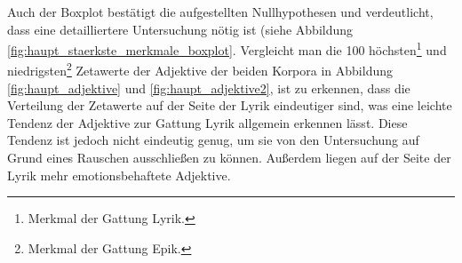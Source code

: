 \documentclass[a4paper,10p]{article}
\begin{document}
Auch der Boxplot bestätigt die aufgestellten Nullhypothesen und verdeutlicht, dass eine detailliertere Untersuchung nötig ist (siehe Abbildung \ref{fig:haupt_staerkste_merkmale_boxplot}. Vergleicht man die 100 höchsten\footnote{Merkmal der Gattung Lyrik.} und niedrigsten\footnote{Merkmal der Gattung Epik.} Zetawerte der Adjektive der beiden Korpora in Abbildung \ref{fig:haupt_adjektive} und \ref{fig:haupt_adjektive2}, ist zu erkennen, dass die Verteilung der Zetawerte auf der Seite der Lyrik eindeutiger sind, was eine leichte Tendenz der Adjektive zur Gattung Lyrik allgemein erkennen lässt. Diese Tendenz ist jedoch nicht eindeutig genug, um sie von den Untersuchung auf Grund eines Rauschen ausschließen zu können. Außerdem liegen auf der Seite der Lyrik mehr emotionsbehaftete Adjektive. \par 
\end{document}
